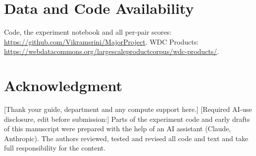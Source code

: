 \documentclass[conference]{IEEEtran}
\begin{document}
\section*{Data and Code Availability}
Code, the experiment notebook and all per-pair scores: \url{https://github.com/Vikramsrini/MajorProject}.
WDC Products: \url{https://webdatacommons.org/largescaleproductcorpus/wdc-products/}.

\section*{Acknowledgment}
[Thank your guide, department and any compute support here.]
{\color{red}[Required AI-use disclosure, edit before submission:]} Parts of the experiment code and early
drafts of this manuscript were prepared with the help of an AI assistant (Claude, Anthropic). The authors
reviewed, tested and revised all code and text and take full responsibility for the content.



\end{document}
